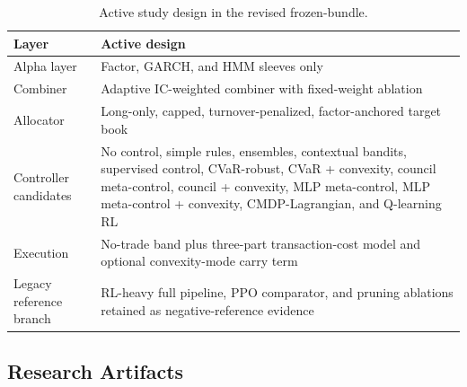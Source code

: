 \documentclass[11pt]{article}
\begin{document}
\begin{table}[H]
\centering
\caption{Active study design in the revised frozen-bundle.}
\label{tab:archsnapshot}
\begin{tabular}{@{} l p{7.1cm} @{}}
\toprule
\textbf{Layer} & \textbf{Active design} \\
\midrule
Alpha layer & Factor, GARCH, and HMM sleeves only \\
Combiner & Adaptive IC-weighted combiner with fixed-weight ablation \\
Allocator & Long-only, capped, turnover-penalized, factor-anchored target book \\
Controller candidates & No control, simple rules, ensembles, contextual bandits, supervised control, CVaR-robust, CVaR + convexity, council meta-control, council + convexity, MLP meta-control, MLP meta-control + convexity, CMDP-Lagrangian, and Q-learning RL \\
Execution & No-trade band plus three-part transaction-cost model and optional convexity-mode carry term \\
Legacy reference branch & RL-heavy full pipeline, PPO comparator, and pruning ablations retained as negative-reference evidence \\
\bottomrule
\end{tabular}
\end{table}

\subsection{Research Artifacts}
\end{document}
